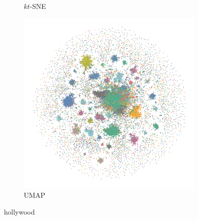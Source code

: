 \begin{appendix}
\begin{figure}[tbp]
\begin{subfigure}{0.45\linewidth}
    \caption{$kt$-SNE}
\end{subfigure}
  \begin{subfigure}{0.45\linewidth}
    \centering
    \includegraphics[width=\linewidth]{img/emb/umap_hollywood}
    \caption{UMAP}
  \end{subfigure}
  \caption{hollywood}
\end{figure}


\end{appendix}
